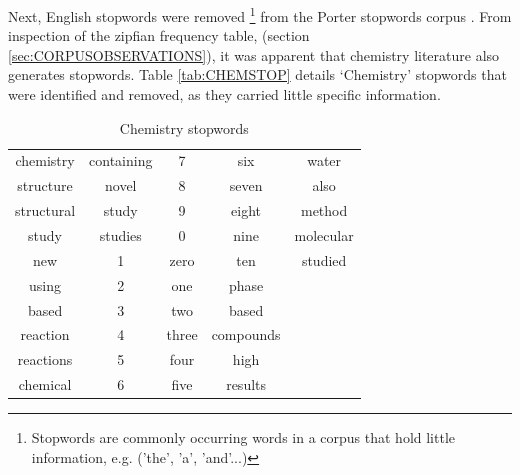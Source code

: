 Next, English stopwords were removed \footnote{Stopwords are commonly occurring words in a corpus that hold little information, e.g. ('the', 'a', 'and'...)} from the Porter stopwords corpus\cite{NLTK} \cite{Porter}. From inspection of the zipfian frequency table, (section \ref{sec:CORPUSOBSERVATIONS}), it was apparent that chemistry literature also generates stopwords. Table \ref{tab:CHEMSTOP} details `Chemistry' stopwords that were identified and removed, as they carried little specific information. 
\begin{table}[h!]
\begin{center}
\caption{Chemistry stopwords}
\begin{tabular}{||c|c|c|c|c||}
\hline
chemistry & containing & 7 & six & water\\
structure & novel & 8 & seven & also\\
structural & study & 9 & eight & method\\
study & studies & 0 & nine & molecular\\
new & 1 & zero & ten & studied\\
using & 2 & one & phase& \\
based & 3 & two & based& \\
reaction & 4 & three & compounds & \\
reactions & 5 & four & high & \\
chemical & 6 & five & results & \\
\hline

\end{tabular}
\end{center}
\end{table}

